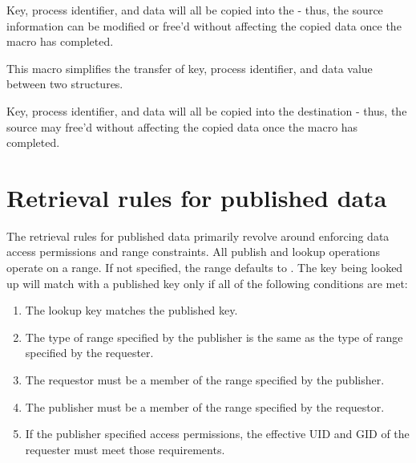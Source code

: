 \adviceuserstart
Key, process identifier, and data will all be copied into the  - thus, the source information can be modified or free'd without affecting the copied data once the macro has completed.
\adviceuserend


This macro simplifies the transfer of key, process identifier, and data value between two structures.


\begin{arglist}
\end{arglist}

\adviceuserstart
Key, process identifier, and data will all be copied into the destination  - thus, the source  may free'd without affecting the copied data once the macro has completed.
\adviceuserend

\section{Retrieval rules for published data}
\label{chap:pub:retrules}

The retrieval rules for published data primarily revolve around enforcing data access permissions and range constraints.
All publish and lookup operations operate on a range. If not specified, the range defaults to .
The key being looked up will match with a published key only if all of the following conditions are met:

\begin{enumerate}
    \item The lookup key matches the published key.
    \item The type of range specified by the publisher is the same as the type of range specified by the requester.
    \item The requestor must be a member of the range specified by the publisher.
    \item The publisher must be a member of the range specified by the requestor.
    \item If the publisher specified access permissions, the effective \ac{UID} and \ac{GID} of the requester must meet those requirements.
\end{enumerate}

